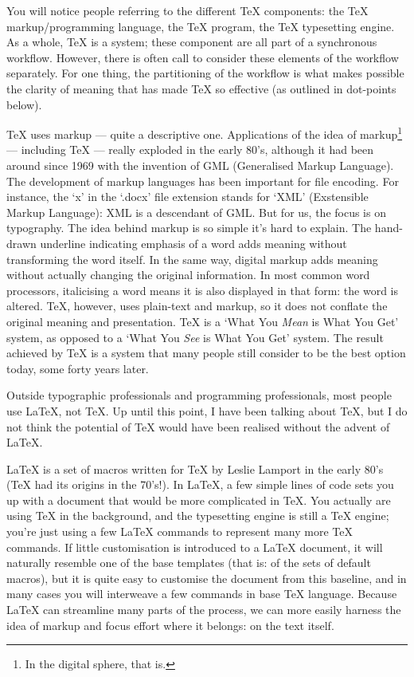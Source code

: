 \documentclass[11pt, oneside]{memoir}
\begin{document}
You will notice people referring to the different TeX components: the TeX markup/programming language, the TeX program, the TeX typesetting engine. As a whole, TeX is a system; these component are all part of a synchronous workflow. However, there is often call to consider these elements of the workflow separately. For one thing, the partitioning of the workflow is what makes possible the clarity of meaning that has made TeX so effective (as outlined in dot-points below).

TeX uses markup — quite a descriptive one. Applications of the idea of markup\footnote{In the digital sphere, that is.} — including TeX — really exploded in the early 80's, although it had been around since 1969 with the invention of GML (Generalised Markup Language). The development of markup languages has been important for file encoding. For instance, the `x' in the `.docx' file extension stands for `XML' (Exstensible Markup Language): XML is a descendant of GML. But for us, the focus is on typography. The idea behind markup is so simple it's hard to explain. The hand-drawn underline indicating emphasis of a word adds meaning without transforming the word itself. In the same way, digital markup adds meaning without actually changing the original information. In most common word processors, italicising a word means it is also displayed in that form: the word is altered. TeX, however, uses plain-text and markup, so it does not conflate the original meaning and presentation. TeX is a `What You \emph{Mean} is What You Get' system, as opposed to a `What You \emph{See} is What You Get' system. The result achieved by TeX is a system that many people still consider to be the best option today, some forty years later.

Outside typographic professionals and programming professionals, most people use \LaTeX{}, not \TeX{}. Up until this point, I have been talking about TeX, but I do not think the potential of TeX would have been realised without the advent of LaTeX.

LaTeX is a set of macros written for TeX by Leslie Lamport in the early 80's (TeX had its origins in the 70's!). In LaTeX, a few simple lines of code sets you up with a document that would be more complicated in TeX. You actually are using TeX in the background, and the typesetting engine is still a TeX engine; you're just using a few LaTeX commands to represent many more TeX commands. If little customisation is introduced to a LaTeX document, it will naturally resemble one of the base templates (that is: of the sets of default macros), but it is quite easy to customise the document from this baseline, and in many cases you will interweave a few commands in base TeX language. Because LaTeX can streamline many parts of the process, we can more easily harness the idea of markup and focus effort where it belongs: on the text itself.
\end{document}
